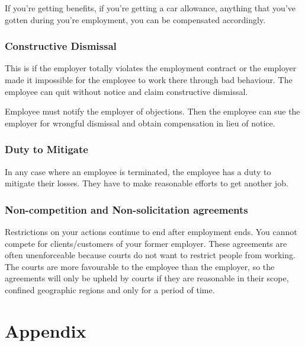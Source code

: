 \documentclass{article}
\renewcommand\appendix{\par
  \setcounter{section}{0}
  \setcounter{subsection}{0}
  \setcounter{figure}{0}
  \setcounter{table}{0}
  \renewcommand\thesection{Appendix \Alph{section}}
  \renewcommand\thefigure{\Alph{section}\arabic{figure}}
  \renewcommand\thetable{\Alph{section}\arabic{table}}
}
\begin{document}
If you're getting benefits, if you're getting a car allowance, anything that you've gotten during you're employment, you can be compensated accordingly.

\subsubsection{Constructive  Dismissal}

This is if the employer totally violates the employment contract or the employer made it impossible for the employee to work there through bad behaviour. The employee can quit without notice and claim constructive dismissal. 

Employee must notify the employer of objections. Then the employee can sue the employer for wrongful dismissal and obtain compensation in lieu of notice.

\subsubsection{Duty to Mitigate}

In any case where an employee is terminated, the employee has a duty to mitigate their losses. They have to make reasonable efforts to get another job.

\subsubsection{Non-competition and Non-solicitation agreements}

Restrictions on your actions continue to end after employment ends. You cannot compete for clients/customers of your former employer. These agreements are often unenforceable because courts do not want to restrict people from working. The courts are more favourable to the employee than the employer, so the agreements will only be upheld by courts if they are reasonable in their scope, confined geographic regions and only for a period of time.

\newpage









\newpage

 
\pagebreak


\appendix
\onehalfspacing
\section*{Appendix}
\renewcommand{\thesubsection}{\Alph{subsection}}
\end{document}
